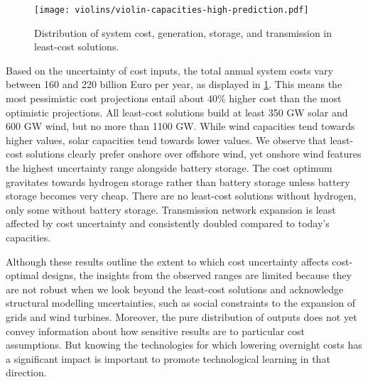 
\begin{figure}
    \centering
    \texttt{[image: violins/violin-capacities-high-prediction.pdf]}
    \caption{
      Distribution of system cost, generation, storage, and transmission
      in least-cost solutions.
    }
    \label{fig:violin}
\end{figure}

Based on the uncertainty of cost inputs, the total annual system costs vary
between 160 and 220 billion Euro per year, as displayed in \cref{fig:violin}.
This means the most pessimistic cost projections entail about 40\% higher cost
than the most optimistic projections. All least-cost solutions build at least
350 GW solar and 600 GW wind, but no more than 1100 GW. While wind capacities
tend towards higher values, solar capacities tend towards lower values. We
observe that least-cost solutions clearly prefer onshore over offshore wind, yet
onshore wind features the highest uncertainty range alongside battery storage.
The cost optimum gravitates towards hydrogen storage rather than battery storage
unless battery storage becomes very cheap. There are no least-cost solutions
without hydrogen, only some without battery storage. Transmission network
expansion is least affected by cost uncertainty and consistently doubled
compared to today's capacities.

Although these results outline the extent to which cost uncertainty affects
cost-optimal designs, the insights from the observed ranges are limited because
they are not robust when we look beyond the least-cost solutions and acknowledge
structural modelling uncertainties, such as social constraints to the expansion
of grids and wind turbines. Moreover, the pure distribution of outputs does not
yet convey information about how sensitive results are to particular cost
assumptions. But knowing the technologies for which lowering overnight costs has
a significant impact is important to promote technological learning in that
direction.

